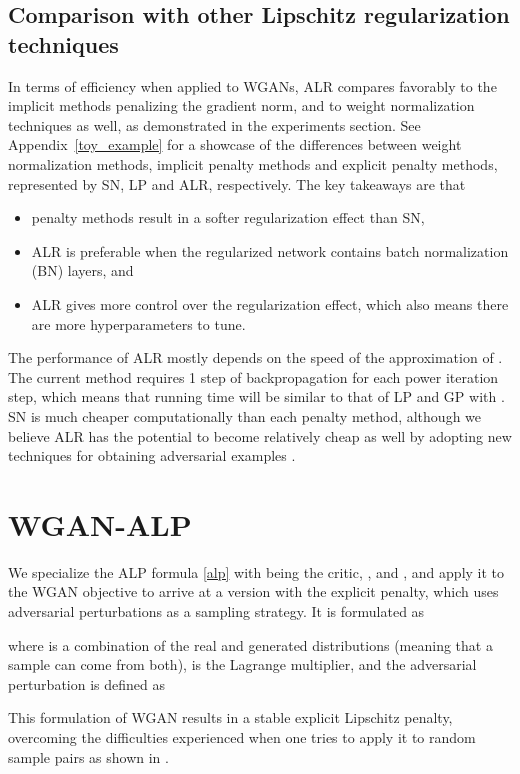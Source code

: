 \documentclass{article}
\begin{document}
\subsection{Comparison with other Lipschitz regularization techniques}
In terms of efficiency when applied to WGANs, ALR compares favorably to the implicit methods penalizing the gradient norm, and to weight normalization techniques as well, as demonstrated in the experiments section. See Appendix~\ref{toy_example} for a showcase of the differences between weight normalization methods, implicit penalty methods and explicit penalty methods, represented by SN, LP and ALR, respectively. The key takeaways are that 
\begin{itemize}
\item penalty methods result in a softer regularization effect than SN, 
\item ALR is preferable when the regularized network contains batch normalization (BN) layers, and 
\item ALR gives more control over the regularization effect, which also means there are more hyperparameters to tune.
\end{itemize}

The performance of ALR mostly depends on the speed of the approximation of . The current method requires 1 step of backpropagation for each power iteration step, which means that running time will be similar to that of LP and GP with . SN is much cheaper computationally than each penalty method, although we believe ALR has the potential to become relatively cheap as well by adopting new techniques for obtaining adversarial examples \citep{Shafahietal2019}.

\section{WGAN-ALP}
We specialize the ALP formula \eqref{alp} with  being the critic, ,  and , and apply it to the WGAN objective to arrive at a version with the explicit penalty, which uses adversarial perturbations as a sampling strategy. It is formulated as

where  is a combination of the real and generated distributions (meaning that a sample  can come from both),  is the Lagrange multiplier, and the adversarial perturbation is defined as

This formulation of WGAN results in a stable explicit Lipschitz penalty, overcoming the difficulties experienced when one tries to apply it to random sample pairs as shown in \citet{Petzkaetal2018}.
\end{document}
